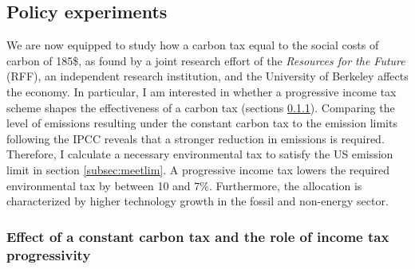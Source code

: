 \subsection{Policy experiments}\label{subsec:exp}


We are now equipped to study how a carbon tax  equal to the social costs of carbon of 185\$, as found by a joint research effort of the \textit{Resources for the Future} (RFF), an independent research institution, and the University of Berkeley \citep{RFF} affects the economy. In particular, I am interested in whether a progressive income tax scheme shapes the effectiveness of a carbon tax (sections \ref{subsec:eff_cc}). 
 Comparing the level of emissions resulting under the constant carbon tax to the emission limits following the IPCC reveals that a stronger reduction in emissions is required. Therefore, I calculate a necessary environmental tax to satisfy the US emission limit in section  \ref{subsec:meetlim}. A progressive income tax lowers the required environmental tax by between 10 and 7\%. Furthermore, the allocation is characterized by higher technology growth in the fossil and non-energy sector.
 


\subsubsection{Effect of a constant carbon tax and the role of income tax progressivity}\label{subsec:eff_cc}

